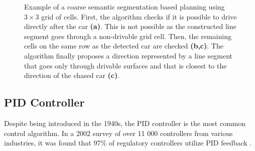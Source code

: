 \documentclass{ctuthesis/ctuthesis}
\begin{document}
\begin{figure}[]
    \centering
    \quad
    \quad
    \caption[Example of a coarse semantic segmentation based planning using $3\times 3$ grid of cells]{Example of a coarse semantic segmentation based planning using $3\times 3$ grid of cells. First, the algorithm checks if it is possible to drive directly after the car \textbf{(a)}. This is not possible as the constructed line segment goes through a non-drivable grid cell. Then, the remaining cells on the same row as the detected car are checked \textbf{(b,c)}. The algorithm finally proposes a direction represented by a line segment that goes only through drivable surfaces and that is closest to the direction of the chased car \textbf{(c)}.}%
    \label{fig:segmentation_planning}%
\end{figure}

\subsection{PID Controller}
Despite being introduced in the 1940s, the PID controller is the most common control algorithm. In a 2002 survey of over 11 000 controllers from various industries, it was found that 97\% of regulatory controllers utilize PID feedback \cite{PID-usage}. 
\end{document}
